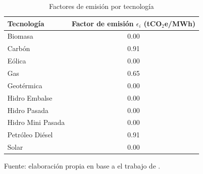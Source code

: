 \begin{table}[H]
\centering
\caption{Factores de emisión por tecnología}
\label{tab:epsilon}
\renewcommand{\arraystretch}{1.2}
\setlength{\tabcolsep}{14pt}
\begin{tabular}{l c}
\toprule
\textbf{Tecnología} & \textbf{Factor de emisión $\epsilon_i$ (tCO$_2$e/MWh)} \\
\midrule
Biomasa            & 0.00 \\
Carbón             & 0.91 \\
Eólica             & 0.00 \\
Gas                & 0.65 \\
Geotérmica         & 0.00 \\
Hidro Embalse      & 0.00 \\
Hidro Pasada       & 0.00 \\
Hidro Mini Pasada  & 0.00 \\
Petróleo Diésel    & 0.91 \\
Solar              & 0.00 \\
\bottomrule
\end{tabular}

\vspace{0.1cm}
\footnotesize{Fuente: elaboración propia en base a el trabajo de .}
\end{table}













































